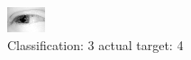 \begin{figure}[h!]
\begin{center}
\includegraphics[width=0.60\columnwidth]{figures/ID2545_class_3_target_4.png}
\end{center}
\caption{ Classification: 3 actual target: 4}
\label{fig:ID2545_class_3_target_4}
\end{figure}
